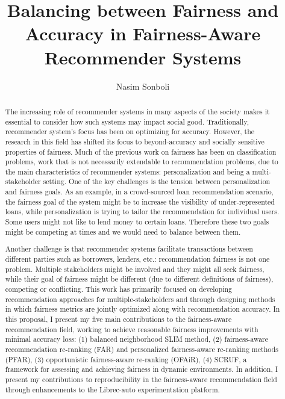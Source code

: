 \documentclass[manuscript,screen,review]{acmart}
\title{Balancing between Fairness and Accuracy in Fairness-Aware Recommender Systems}
\author{Nasim Sonboli}
\begin{document}
\begin{abstract}


The increasing role of recommender systems in many aspects of the society makes it essential to consider how such systems may impact social good. Traditionally, recommender system's focus has been on optimizing for accuracy. However, the research in this field has shifted its focus to beyond-accuracy and socially sensitive properties of fairness. Much of the previous work on fairness has been on classification problems,  work that is not necessarily extendable to recommendation problems, due to the main characteristics of recommender systems: personalization and being a multi-stakeholder setting.
One of the key challenges is the tension between personalization and fairness goals. As an example, in a crowd-sourced loan recommendation scenario, the fairness goal of the system might be to increase the visibility of under-represented loans, while personalization is trying to tailor the recommendation for individual users. Some users might not like to lend money to certain loans. Therefore these two goals might be competing at times and we would need to balance between them.

Another challenge is that recommender systems facilitate transactions between different parties such as borrowers, lenders, etc.: recommendation fairness is not one problem. Multiple stakeholders might be involved and they might all seek fairness, while their goal of fairness might be different (due to different definitions of fairness), competing or conflicting. This work has primarily focused on developing recommendation approaches for multiple-stakeholders and through designing methods in which fairness metrics are jointly optimized along with recommendation accuracy. In this proposal, I present my five main contributions to the fairness-aware recommendation field, working to achieve reasonable fairness improvements with minimal accuracy loss: (1) balanced neighborhood SLIM method, (2) fairness-aware recommendation re-ranking (FAR) and personalized fairness-aware re-ranking methods (PFAR), (3) opportunistic fairness-aware re-ranking (OFAiR), (4) SCRUF, a framework for assessing and achieving fairness in dynamic environments. In addition, I present my contributions to reproducibility in the fairness-aware recommendation field through enhancements to the Librec-auto experimentation platform.

\end{abstract}

\maketitle
\end{document}
